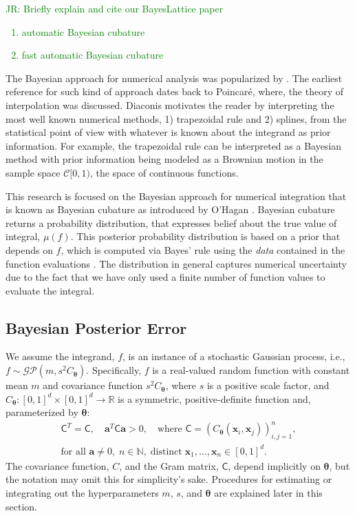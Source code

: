 \documentclass{svjour3}                     %
\newcommand{\bm}[1]{\boldsymbol{#1}}
\newcommand{\vtheta}{{\bm{\theta}}}
\newcommand{\va}{\bm{a}}
\newcommand{\vx}{\bm{x}}
\newcommand{\mC}{\mathsf{C}}
\newcommand{\JRNote}[1]{{\textcolor{green}{JR: #1}}}
\begin{document}
\JRNote{
Briefly explain and cite our BayesLattice paper
\begin{enumerate}
	\item automatic Bayesian cubature
	\item fast automatic Bayesian cubature
\end{enumerate}
}



The Bayesian approach for numerical analysis was popularized by 
\cite{Dia88a}. The earliest reference for such kind of approach dates back to Poincar\'e, where, the theory of interpolation was discussed.
Diaconis motivates the reader by interpreting the most well known numerical methods, 1) trapezoidal rule and 2) splines, from the statistical point of view with whatever is known about the integrand as prior information. 
For example, the trapezoidal rule can be interpreted as a Bayesian method with prior information being modeled as a Brownian motion in the sample space $\mathcal{C}[0,1)$, the space of continuous functions. %

This research is focused on the Bayesian approach for numerical integration that is known as Bayesian cubature as introduced by O'Hagan \cite{OHagen1991}.  %
Bayesian cubature returns a probability distribution, that expresses belief about the true value of integral, $\mu(f)$.
This posterior probability distribution is based on a prior that depends on $f$, which is computed via Bayes' rule using the \emph{data} contained in the function evaluations \cite{BriEtal18a}. 
The distribution in general captures numerical uncertainty due to the fact that we have only used a finite number of function values to evaluate the integral.

\subsection{Bayesian Posterior Error}
\label{sec:BayesPostErr}

We assume the integrand, $f$, is an instance of a stochastic Gaussian process, i.e., $f \sim \mathcal{GP}(m,s^2 C_\vtheta)$.  Specifically, $f$ is a real-valued random function with constant mean $m$ and covariance function $s^2C_\vtheta$, where $s$ is a positive scale factor, and $C_\vtheta: [0,1]^d \times [0,1]^d \to \mathbb{R} $ is a symmetric, positive-definite function and, parameterized by $\vtheta$:
\begin{multline} \label{FJH:eq:CondPosDef}
\mC^T = \mC,  \quad \va^T \mC \va > 0, \quad \text{where }  \mC = \left(  C_\vtheta(\vx_i,\vx_j)  \right)_{i,j=1}^n,\\
\text{for all } \va \ne 0, \;
n\in \mathbb{N}, \; \text{distinct} \; \vx_1, \ldots, \vx_n \in [0,1]^d.
\end{multline}
The covariance function, $C$, and the Gram matrix, $\mC$, depend implicitly on $\vtheta$, but the notation may omit this for simplicity's sake.
Procedures for estimating or integrating out the hyperparameters $m$, $s$, and $\vtheta$ are explained later in this section.
\end{document}
